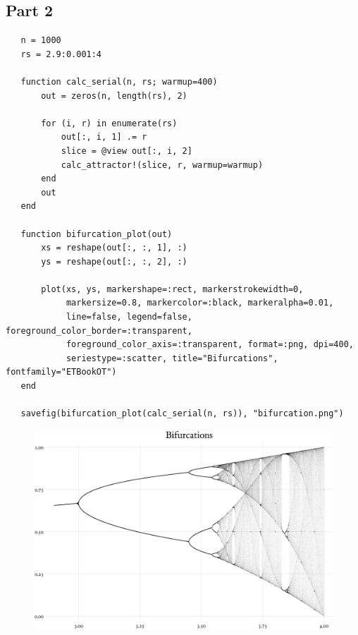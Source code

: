 \documentclass[nobib]{tufte-handout}
\begin{document}
\subsection{Part 2}
\label{sec:org13cb417}
\begin{verbatim}
   n = 1000
   rs = 2.9:0.001:4

   function calc_serial(n, rs; warmup=400)
       out = zeros(n, length(rs), 2)

       for (i, r) in enumerate(rs)
           out[:, i, 1] .= r
           slice = @view out[:, i, 2]
           calc_attractor!(slice, r, warmup=warmup)
       end
       out
   end

   function bifurcation_plot(out)
       xs = reshape(out[:, :, 1], :)
       ys = reshape(out[:, :, 2], :)

       plot(xs, ys, markershape=:rect, markerstrokewidth=0,
            markersize=0.8, markercolor=:black, markeralpha=0.01,
            line=false, legend=false, foreground_color_border=:transparent,
            foreground_color_axis=:transparent, format=:png, dpi=400,
            seriestype=:scatter, title="Bifurcations", fontfamily="ETBookOT")
   end

   savefig(bifurcation_plot(calc_serial(n, rs)), "bifurcation.png")
\end{verbatim}

\begin{figure}
\centering
\includegraphics[width=.9\linewidth]{./bifurcation.png}
\end{figure}
\end{document}
